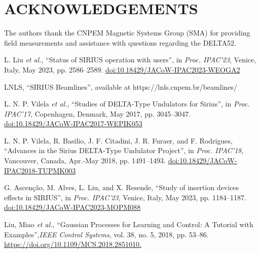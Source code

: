 \documentclass[a4paper,
               keeplastbox,   %
               ]{jacow}
\begin{document}
\section{ACKNOWLEDGEMENTS}

The authors thank the CNPEM Magnetic Systems Group (SMA) for providing field measurements and assistance with questions regarding the DELTA52.

\begin{thebibliography}{14} %

   L. Liu \emph{et al.},
   \textquotedblleft{Status of SIRIUS operation with users}\textquotedblright,
   in \emph{Proc. IPAC’23}, Venice, Italy, May 2023, pp. 2586--2589.
   \url{doi:10.18429/JACoW-IPAC2023-WEOGA2}    
    

    LNLS,
    \textquotedblleft{SIRIUS Beamlines}\textquotedblright,
    available at https://lnls.cnpem.br/beamlines/

    L. N. P. Vilela \emph{et al.},
    \textquotedblleft{Studies of DELTA-Type Undulators for Sirius}\textquotedblright,
    in \emph{Proc. IPAC’17}, Copenhagen, Denmark, May 2017, pp. 3045--3047.
    \url{doi:10.18429/JACoW-IPAC2017-WEPIK053} 
    
   L. N. P. Vilela, R. Basilio, J. F. Citadini, J. R. Furaer, and F. Rodrigues,
   \textquotedblleft{Advances in the Sirius DELTA-Type Undulator Project}\textquotedblright,
   in \emph{Proc. IPAC’18}, Vancouver, Canada, Apr.-May 2018, pp. 1491--1493.
   \url{doi:10.18429/JACoW-IPAC2018-TUPMK003}  

   G. Ascenção, M. Alves, L. Liu, and X. Resende,
   \textquotedblleft{Study of insertion devices effects in SIRIUS}\textquotedblright,
   in \emph{Proc. IPAC’23}, Venice, Italy, May 2023, pp. 1184--1187.
   \url{doi:10.18429/JACoW-IPAC2023-MOPM088}    

    Liu, Miao \emph{et al.},  
    \textquotedblleft{Gaussian Processes for Learning and Control: A Tutorial with Examples}\textquotedblright,\emph{IEEE Control Systems}, vol. 38, no. 5, 2018, pp. 53–86.
    \url{https://doi.org/10.1109/MCS.2018.2851010. }


\end{thebibliography}
\end{document}
